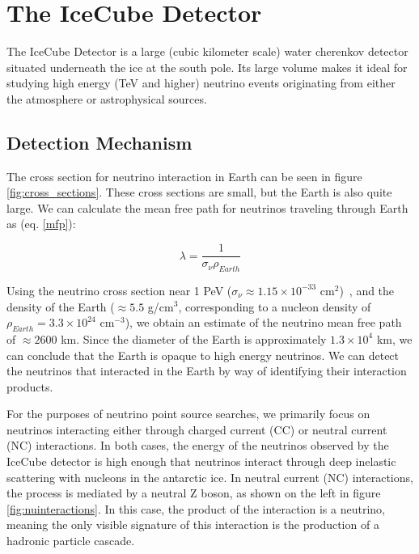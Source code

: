 \chapter{The IceCube Detector}\label{chapter:icecubedetector}
The IceCube Detector is a large (cubic kilometer scale) water cherenkov detector situated underneath the ice at the south pole. Its large volume makes it ideal for studying high energy (TeV and higher) neutrino events originating from either the atmosphere or astrophysical sources. 

\section{Detection Mechanism}
The cross section for neutrino interaction in Earth can be seen in figure \ref{fig:cross_sections}. These cross sections are small, but the Earth is also quite large. We can calculate the mean free path for neutrinos traveling through Earth as (eq. \ref{mfp}):

\begin{equation}
    \lambda = \frac{1}{\sigma_{\nu}\rho_{Earth}}
    \label{mfp}
\end{equation}

Using the neutrino cross section near 1 PeV ($\sigma_{\nu} \approx 1.15 \times 10^{-33}$ cm$^2$)~\cite{nuxsection}, and the density of the Earth ($\approx 5.5$ g/cm$^3$, corresponding to a nucleon density of $\rho_{Earth}=3.3 \times 10^{24}$ cm$^{-3}$), we obtain an estimate of the neutrino mean free path of $\approx 2600$ km. Since the diameter of the Earth is approximately $1.3 \times 10^4$ km, we can conclude that the Earth is opaque to high energy neutrinos. We can detect the neutrinos that interacted in the Earth by way of identifying their interaction products. 

For the purposes of neutrino point source searches, we primarily focus on neutrinos interacting either through charged current (CC) or neutral current (NC) interactions. In both cases, the energy of the neutrinos observed by the IceCube detector is high enough that neutrinos interact through deep inelastic scattering with nucleons in the antarctic ice. In neutral current (NC) interactions, the process is mediated by a neutral Z boson, as shown on the left in figure \ref{fig:nuinteractions}. In this case, the product of the interaction is a neutrino, meaning the only visible signature of this interaction is the production of a hadronic particle cascade. 


